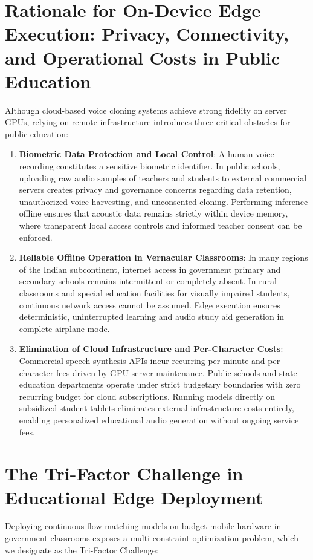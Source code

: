 \section[Rationale for On-Device Edge Execution]{Rationale for On-Device Edge Execution: Privacy, Connectivity, and Operational Costs in Public Education}
Although cloud-based voice cloning systems achieve strong fidelity on server GPUs, relying on remote infrastructure introduces three critical obstacles for public education:
\begin{enumerate}[leftmargin=*]
    \item \textbf{Biometric Data Protection and Local Control}: A human voice recording constitutes a sensitive biometric identifier. In public schools, uploading raw audio samples of teachers and students to external commercial servers creates privacy and governance concerns regarding data retention, unauthorized voice harvesting, and unconsented cloning. Performing inference offline ensures that acoustic data remains strictly within device memory, where transparent local access controls and informed teacher consent can be enforced.
    
    \item \textbf{Reliable Offline Operation in Vernacular Classrooms}: In many regions of the Indian subcontinent, internet access in government primary and secondary schools remains intermittent or completely absent. In rural classrooms and special education facilities for visually impaired students, continuous network access cannot be assumed. Edge execution ensures deterministic, uninterrupted learning and audio study aid generation in complete airplane mode.
    
    \item \textbf{Elimination of Cloud Infrastructure and Per-Character Costs}: Commercial speech synthesis APIs incur recurring per-minute and per-character fees driven by GPU server maintenance. Public schools and state education departments operate under strict budgetary boundaries with zero recurring budget for cloud subscriptions. Running models directly on subsidized student tablets eliminates external infrastructure costs entirely, enabling personalized educational audio generation without ongoing service fees.
\end{enumerate}

\section{The Tri-Factor Challenge in Educational Edge Deployment}
Deploying continuous flow-matching models on budget mobile hardware in government classrooms exposes a multi-constraint optimization problem, which we designate as the Tri-Factor Challenge:

